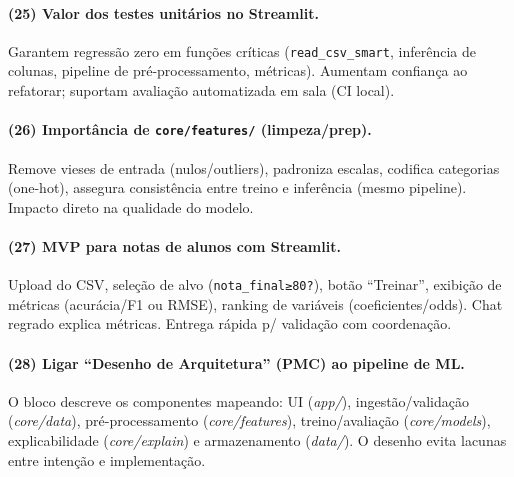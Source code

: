 \documentclass[12pt,a4paper]{article}
\begin{document}
\paragraph{(25) Valor dos testes unitários no Streamlit.}
Garantem regressão zero em funções críticas (\texttt{read\_csv\_smart}, inferência de colunas, pipeline de pré-processamento, métricas). 
Aumentam confiança ao refatorar; suportam avaliação automatizada em sala (CI local).

\paragraph{(26) Importância de \texttt{core/features/} (limpeza/prep).}
Remove vieses de entrada (nulos/outliers), padroniza escalas, codifica categorias (one-hot), assegura consistência entre treino e inferência (mesmo pipeline). Impacto direto na qualidade do modelo.

\paragraph{(27) MVP para notas de alunos com Streamlit.}
Upload do CSV, seleção de alvo (\texttt{nota\_final≥80?}), botão “Treinar”, exibição de métricas (acurácia/F1 ou RMSE), ranking de variáveis (coeficientes/odds). Chat regrado explica métricas. Entrega rápida p/ validação com coordenação.

\paragraph{(28) Ligar “Desenho de Arquitetura” (PMC) ao pipeline de ML.}
O bloco descreve os componentes mapeando: UI (\textit{app/}), ingestão/validação (\textit{core/data}), pré-processamento (\textit{core/features}), treino/avaliação (\textit{core/models}), explicabilidade (\textit{core/explain}) e armazenamento (\textit{data/}). O desenho evita lacunas entre intenção e implementação.
\end{document}
